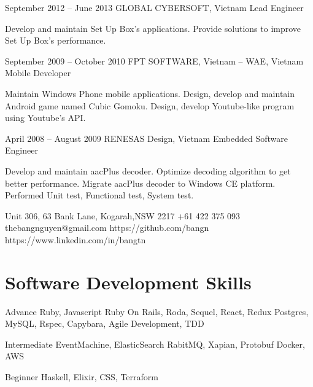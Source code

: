 \documentclass{tccv}
\begin{document}
\begin{eventlist}
\item{September 2012 -- June 2013}
    {GLOBAL CYBERSOFT, Vietnam}
    {Lead Engineer}

Develop and maintain Set Up Box's applications.
Provide solutions to improve Set Up Box's performance.

\item{September 2009 -- October 2010}
    {FPT SOFTWARE, Vietnam -- WAE, Vietnam}
    {Mobile Developer}

Maintain Windows Phone mobile applications.
\newline Design, develop and maintain Android game named Cubic Gomoku.
\newline Design, develop Youtube-like program using Youtube's API.

\item{April 2008 -- August 2009}
    {RENESAS Design, Vietnam}
    {Embedded Software Engineer}

Develop and maintain aacPlus decoder.
Optimize decoding algorithm to get better performance.
Migrate aacPlus decoder to Windows CE platform.
Performed Unit test, Functional test, System test.

\end{eventlist}

\personal
    {Unit 306, 63 Bank Lane, Kogarah,\newline NSW 2217}
    {+61 422 375 093}
    {thebangnguyen@gmail.com}
    {https://github.com/bangn}
    {https://www.linkedin.com/in/bangtn}

\section{Software Development Skills}

\begin{factlist}

\item{Advance}
    {Ruby, Javascript
    \newline Ruby On Rails, Roda, Sequel, React, Redux
    \newline Postgres, MySQL,
    \newline Rspec, Capybara,
    \newline Agile Development, TDD}

\item{Intermediate}
    {EventMachine, ElasticSearch
    \newline RabitMQ, Xapian, Protobuf
    \newline Docker, AWS}

\item{Beginner}
    {Haskell, Elixir, CSS, Terraform}
\end{factlist}
\end{document}
